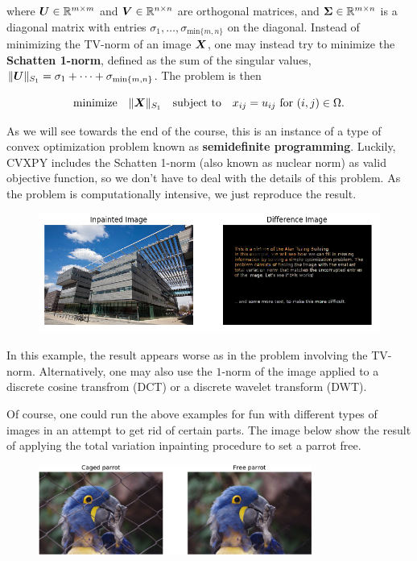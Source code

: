 \begin{example}
where $\bm{U}\in \mathbb{R}^{m\times m}$ and $\bm{V}\in \mathbb{R}^{n\times n}$ are orthogonal matrices, and $\bm{\Sigma}\in \mathbb{R}^{m\times n}$ is a diagonal matrix with entries $\sigma_{1},\dots,\sigma_{\mathrm{min}\{m,n\}}$ on the diagonal. Instead of minimizing the TV-norm of an image $\bm{X}$, one may instead try to minimize the \textbf{Schatten 1-norm}, defined as the sum of the singular values, $\|\bm{U}\|_{S_1} = \sigma_1+\cdots+\sigma_{\mathrm{min}\{m,n\}}$. The problem is then

\begin{equation*}
  \text{minimize}\quad \|\bm{X}\|_{S_1} \quad\text{subject to}\quad x_{ij} = u_{ij} \text{ for } (i,j) \in \Omega.
\end{equation*}

As we will see towards the end of the course, this is an instance of a type of convex optimization problem known as \textbf{semidefinite programming}. Luckily, CVXPY includes the Schatten 1-norm (also known as nuclear norm) as valid objective function, so we don't have to deal with the details of this problem. As the problem is computationally intensive, we just reproduce the result.

\begin{figure}[h!]
\centering
\includegraphics[width=1\textwidth]{images/nucnorm-inpaint.png}
\end{figure}

In this example, the result appears worse as in the problem involving the TV-norm. Alternatively, one may also use the $1$-norm of the image applied to a discrete cosine transfrom (DCT) or a discrete wavelet transform (DWT).

Of course, one could run the above examples for fun with different types of images in an attempt to get rid of certain parts. The image below show the result of applying the total variation inpainting procedure to set a parrot free.

\begin{figure}[h!]
\centering
\includegraphics[width=0.8\textwidth]{images/parrot-crop.pdf}
\end{figure}
\end{example}


